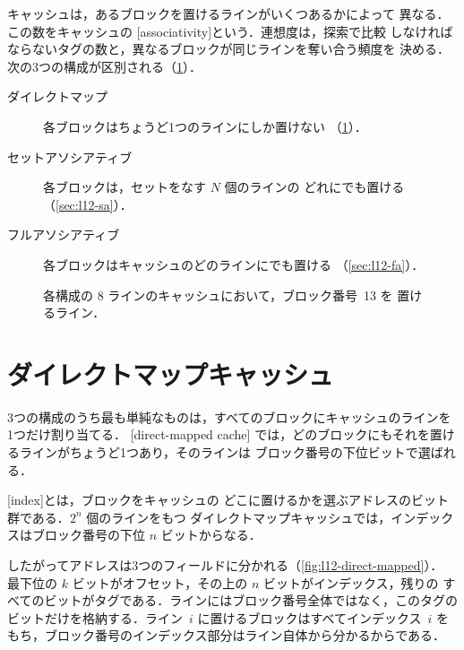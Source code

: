 \documentclass[../main.tex]{subfiles}
\begin{document}
キャッシュは，あるブロックを置けるラインがいくつあるかによって
異なる．この数をキャッシュの
[associativity]という．連想度は，探索で比較
しなければならないタグの数と，異なるブロックが同じラインを奪い合う頻度を
決める．次の3つの構成が区別される（\cref{fig:l12-placement}）．
\begin{description}
  \item[ダイレクトマップ] 各ブロックはちょうど1つのラインにしか置けない
    （\cref{sec:l12-dm}）．
  \item[セットアソシアティブ] 各ブロックは，セットをなす $N$ 個のラインの
    どれにでも置ける（\cref{sec:l12-sa}）．
  \item[フルアソシアティブ] 各ブロックはキャッシュのどのラインにでも置ける
    （\cref{sec:l12-fa}）．
\end{description}

\begin{figure}[htbp]
  \centering
  
  \caption{各構成の 8 ラインのキャッシュにおいて，ブロック番号~13 を
    置けるライン．}
  \label{fig:l12-placement}
\end{figure}

\section{ダイレクトマップキャッシュ}
\label{sec:l12-dm}

3つの構成のうち最も単純なものは，すべてのブロックにキャッシュのラインを
1つだけ割り当てる．
[direct-mapped cache]%
では，どのブロックにもそれを置けるラインがちょうど1つあり，そのラインは
ブロック番号の下位ビットで選ばれる．

\begin{definition}[インデックス]
  [index]とは，ブロックをキャッシュの
  どこに置けるかを選ぶアドレスのビット群である．$2^{n}$ 個のラインをもつ
  ダイレクトマップキャッシュでは，インデックスはブロック番号の下位 $n$
  ビットからなる．
\end{definition}

したがってアドレスは3つのフィールドに分かれる（\cref{fig:l12-direct-mapped}）．
最下位の $k$ ビットがオフセット，その上の $n$ ビットがインデックス，残りの
すべてのビットがタグである．ラインにはブロック番号全体ではなく，このタグの
ビットだけを格納する．ライン~$i$ に置けるブロックはすべてインデックス~$i$
をもち，ブロック番号のインデックス部分はライン自体から分かるからである．
\end{document}
